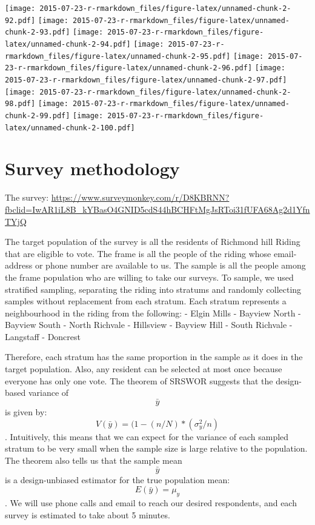 \documentclass[
]{article}
\begin{document}
\texttt{[image: 2015-07-23-r-rmarkdown\_files/figure-latex/unnamed-chunk-2-92.pdf]}
\texttt{[image: 2015-07-23-r-rmarkdown\_files/figure-latex/unnamed-chunk-2-93.pdf]}
\texttt{[image: 2015-07-23-r-rmarkdown\_files/figure-latex/unnamed-chunk-2-94.pdf]}
\texttt{[image: 2015-07-23-r-rmarkdown\_files/figure-latex/unnamed-chunk-2-95.pdf]}
\texttt{[image: 2015-07-23-r-rmarkdown\_files/figure-latex/unnamed-chunk-2-96.pdf]}
\texttt{[image: 2015-07-23-r-rmarkdown\_files/figure-latex/unnamed-chunk-2-97.pdf]}
\texttt{[image: 2015-07-23-r-rmarkdown\_files/figure-latex/unnamed-chunk-2-98.pdf]}
\texttt{[image: 2015-07-23-r-rmarkdown\_files/figure-latex/unnamed-chunk-2-99.pdf]}
\texttt{[image: 2015-07-23-r-rmarkdown\_files/figure-latex/unnamed-chunk-2-100.pdf]}

\hypertarget{survey-methodology}{%
\section{Survey methodology}\label{survey-methodology}}

The survey:
\url{https://www.surveymonkey.com/r/D8KBRNN?fbclid=IwAR1iL8B_kYBasO4GNID5cdS44hBCHFtMgJsRToi31fUFA68Ag2d1YfnTYjQ}

The target population of the survey is all the residents of Richmond
hill Riding that are eligible to vote. The frame is all the people of
the riding whose email-address or phone number are available to us. The
sample is all the people among the frame population who are willing to
take our surveys. To sample, we used stratified sampling, separating the
riding into stratums and randomly collecting samples without replacement
from each stratum. Each stratum represents a neighbourhood in the riding
from the following: - Elgin Mills - Bayview North - Bayview South -
North Richvale - Hillsview - Bayview Hill - South Richvale - Langstaff -
Doncrest

Therefore, each stratum has the same proportion in the sample as it does
in the target population. Also, any resident can be selected at most
once because everyone has only one vote. The theorem of SRSWOR suggests
that the design-based variance of \[\bar{y}\] is given by:
\[V(\bar{y}) = (1 - (n/N)*(\sigma^2_y/n)\]. Intuitively, this means that
we can expect for the variance of each sampled stratum to be very small
when the sample size is large relative to the population. The theorem
also tells us that the sample mean \[\bar{y}\] is a design-unbiased
estimator for the true population mean: \[E(\bar{y}) = \mu_y\]. We will
use phone calls and email to reach our desired respondents, and each
survey is estimated to take about 5 minutes.
\end{document}

